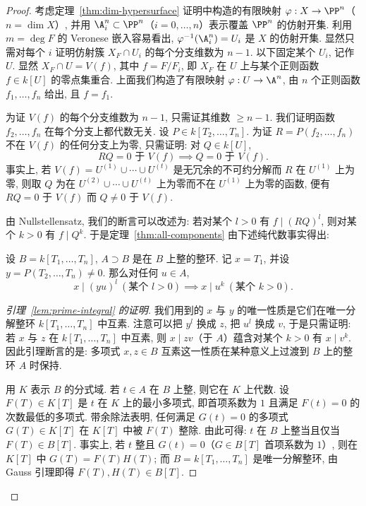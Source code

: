 \begin{proof}
	考虑定理~\ref{thm:dim-hypersurface} 证明中构造的有限映射 $\varphi: X \to \PP^n$（$n = \dim X$）, 并用 $\A^n_i \subset \PP^n$（$i = 0, \ldots, n$）表示覆盖 $\PP^n$ 的仿射开集. 利用 $m = \deg F$ 的 Veronese 嵌入容易看出, $\varphi^{-1}(\A^n_i) = U_i$ 是 $X$ 的仿射开集. 显然只需对每个 $i$ 证明仿射簇 $X_F \cap U_i$ 的每个分支维数为 $n-1$. 以下固定某个 $U_i$, 记作 $U$. 显然 $X_F \cap U = V(f)$, 其中 $f = F/F_i$, 即 $X_F$ 在 $U$ 上与某个正则函数 $f \in k[U]$ 的零点集重合. 上面我们构造了有限映射 $\varphi: U \to \A^n$, 由 $n$ 个正则函数 $f_1, \ldots, f_n$ 给出, 且 $f = f_1$.

	为证 $V(f)$ 的每个分支维数为 $n-1$, 只需证其维数 $\ge n-1$. 我们证明函数 $f_2, \ldots, f_n$ 在每个分支上都代数无关. 设 $P \in k[T_2, \ldots, T_n]$. 为证 $R = P(f_2, \ldots, f_n)$ 不在 $V(f)$ 的任何分支上为零, 只需证明: 对 $Q \in k[U]$,
	\[
		RQ = 0 \text{ 于 } V(f) \implies Q = 0 \text{ 于 } V(f).
	\]
	事实上, 若 $V(f) = U^{(1)} \cup \cdots \cup U^{(t)}$ 是无冗余的不可约分解而 $R$ 在 $U^{(1)}$ 上为零, 则取 $Q$ 为在 $U^{(2)} \cup \cdots \cup U^{(t)}$ 上为零而不在 $U^{(1)}$ 上为零的函数, 便有 $RQ = 0$ 于 $V(f)$ 而 $Q \ne 0$ 于 $V(f)$.

	由 Nullstellensatz, 我们的断言可以改述为: 若对某个 $l > 0$ 有 $f \mid (RQ)^l$, 则对某个 $k > 0$ 有 $f \mid Q^k$. 于是定理~\ref{thm:all-components} 由下述纯代数事实得出:

	\begin{lemma}\label{lem:prime-integral}
		设 $B = k[T_1, \ldots, T_n]$, $A \supset B$ 是在 $B$ 上整的整环. 记 $x = T_1$, 并设 $y = P(T_2, \ldots, T_n) \ne 0$. 那么对任何 $u \in A$,
		\[
			x \mid (yu)^l\ (\text{某个 } l > 0) \implies x \mid u^k\ (\text{某个 } k > 0).
		\]
	\end{lemma}

	\begin{proof}[引理~\ref{lem:prime-integral} 的证明]
		我们用到的 $x$ 与 $y$ 的唯一性质是它们在唯一分解整环 $k[T_1, \ldots, T_n]$ 中互素. 注意可以把 $y^l$ 换成 $z$, 把 $u^l$ 换成 $v$, 于是只需证明: 若 $x$ 与 $z$ 在 $k[T_1, \ldots, T_n]$ 中互素, 则 $x \mid zv$（于 $A$）蕴含对某个 $k > 0$ 有 $x \mid v^k$. 因此引理断言的是: 多项式 $x, z \in B$ 互素这一性质在某种意义上过渡到 $B$ 上的整环 $A$ 时保持.

		用 $K$ 表示 $B$ 的分式域. 若 $t \in A$ 在 $B$ 上整, 则它在 $K$ 上代数. 设 $F(T) \in K[T]$ 是 $t$ 在 $K$ 上的最小多项式, 即首项系数为 $1$ 且满足 $F(t) = 0$ 的次数最低的多项式. 带余除法表明, 任何满足 $G(t) = 0$ 的多项式 $G(T) \in K[T]$ 在 $K[T]$ 中被 $F(T)$ 整除. 由此可得: $t$ 在 $B$ 上整当且仅当 $F(T) \in B[T]$. 事实上, 若 $t$ 整且 $G(t) = 0$（$G \in B[T]$ 首项系数为 $1$）, 则在 $K[T]$ 中 $G(T) = F(T) H(T)$; 而 $B = k[T_1, \ldots, T_n]$ 是唯一分解整环, 由 Gauss 引理即得 $F(T), H(T) \in B[T]$.


\end{proof}
\end{proof}
